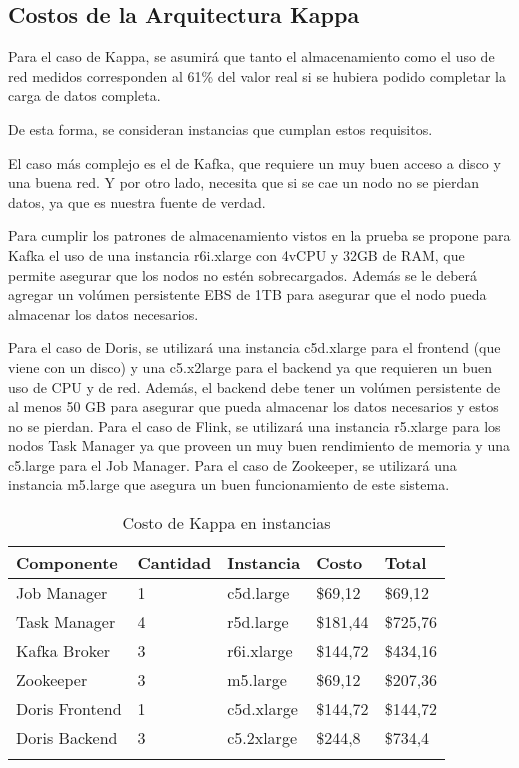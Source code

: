 \newpage
\subsection{Costos de la Arquitectura Kappa}

Para el caso de Kappa, se asumirá que tanto el almacenamiento como el uso de red medidos corresponden al 61\% del valor real si se hubiera podido completar la carga de datos completa.

De esta forma, se consideran instancias que cumplan estos requisitos. 

El caso más complejo es el de Kafka, que requiere un muy buen acceso a disco y una buena red. Y por otro lado, necesita que si se cae un nodo no se pierdan datos, ya que es nuestra fuente de verdad. \newline

Para cumplir los patrones de almacenamiento vistos en la prueba se propone para Kafka el uso de una instancia r6i.xlarge con 4vCPU y 32GB de RAM,
 que permite asegurar que los nodos no estén sobrecargados. Además se le deberá agregar un volúmen persistente EBS de 1TB para asegurar que el nodo pueda almacenar los datos necesarios.\newline

Para el caso de Doris, se utilizará una instancia c5d.xlarge para el frontend (que viene con un disco) y una c5.x2large para el backend ya que requieren un buen uso de CPU y de red. 
Además, el backend debe tener un volúmen persistente de al menos 50 GB para asegurar que pueda almacenar los datos necesarios y estos no se pierdan. \newline
Para el caso de Flink, se utilizará una instancia r5.xlarge para los nodos Task Manager  ya que proveen un muy buen rendimiento de memoria y una c5.large para el Job Manager. \newline
Para el caso de Zookeeper, se utilizará una instancia m5.large que asegura un buen funcionamiento de este sistema.  

\newpage

\begin{longtable}{|p{3cm}|p{2cm}|p{2cm}|p{2cm}|p{3cm}|}
    \hline
    \textbf{Componente} & \textbf{Cantidad} & \textbf{Instancia} & \textbf{Costo} & \textbf{Total} \\
    \hline
    Job Manager & 1 & c5d.large & \$69,12 & \$69,12 \\
    \hline
    Task Manager & 4 & r5d.large & \$181,44 & \$725,76 \\
    \hline
    Kafka Broker & 3 & r6i.xlarge & \$144,72 & \$434,16 \\
    \hline
    Zookeeper & 3 & m5.large & \$69,12 & \$207,36 \\
    \hline
    Doris Frontend & 1 & c5d.xlarge & \$144,72 & \$144,72 \\
    \hline
    Doris Backend & 3 & c5.2xlarge & \$244,8 & \$734,4 \\
    \hline
    \caption{Costo de Kappa en instancias} \\
\end{longtable}

